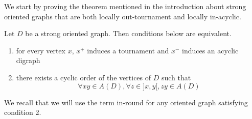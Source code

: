 We start by proving the theorem mentioned in the introduction about strong oriented graphs that are both locally out-tournament and locally in-acyclic. 
\begin{theorem}\label{thm:in-round}
Let $D$ be a strong oriented graph. Then conditions below are equivalent.
\begin{enumerate}
    
    \item \label{itm:in-round_fst_2}   for every vertex $x$, $x^+$ induces a tournament and $x^-$ induces an acyclic digraph 
    \item \label{itm:in-round_snd_2}  there exists a cyclic order of the vertices of $D$ such that 
$$\forall xy\in A(D), \forall z\in ]x,y[, zy\in A(D)$$
    

\end{enumerate}
\end{theorem}
We recall that we will use the term in-round for any oriented graph satisfying condition 2.

